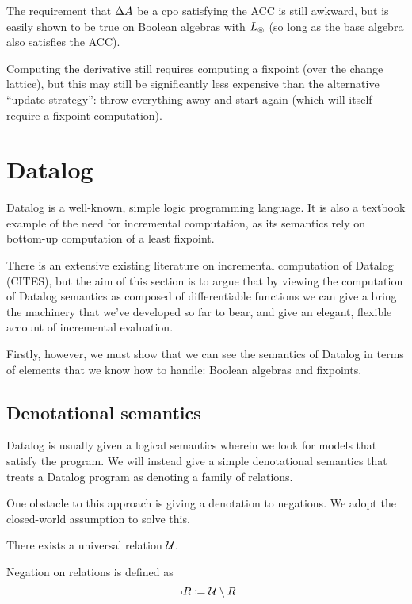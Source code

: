 The requirement that $\Delta A$ be a cpo satisfying the ACC is still awkward, but is easily
shown to be true on Boolean algebras with $L_\circledast$ (so long as the base
algebra also satisfies the ACC).

Computing the derivative still requires computing a fixpoint (over the change
lattice), but this may still be significantly less expensive than the
alternative ``update strategy'': throw everything away and start
again (which will itself require a fixpoint computation).

\section{Datalog}
\label{sec:datalog}

Datalog is a well-known, simple logic programming language. It is also a textbook
example of the need for incremental computation, as its semantics rely on
bottom-up computation of a least fixpoint.

There is an extensive existing literature on incremental computation of Datalog
(CITES), but the aim of this section is to argue that by viewing the computation
of Datalog semantics as composed of differentiable functions we can give a
bring the machinery that we've developed so far to bear, and give an elegant,
flexible account of incremental evaluation.

Firstly, however, we must show that we can see the semantics of Datalog in terms
of elements that we know how to handle: Boolean algebras and fixpoints.

\subsection{Denotational semantics}

Datalog is usually given a logical semantics wherein we look for models that
satisfy the program. We will instead give a simple denotational semantics that treats a Datalog
program as denoting a family of relations.

One obstacle to this approach is giving a denotation to negations. We adopt the
closed-world assumption to solve this.

\begin{defn}
  There exists a universal relation $\mathcal{U}$.
  
  Negation on relations is defined as $$\neg R \coloneqq \mathcal{U} \setminus R$$
\end{defn}

